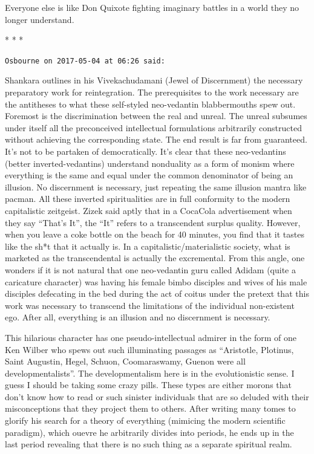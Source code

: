 Everyone else is like Don Quixote fighting imaginary battles in a world they no longer understand.



\begin{center}* * *\end{center}

\begin{footnotesize}
\begin{sffamily}
\texttt{Osbourne on 2017-05-04 at 06:26 said:}

Shankara outlines in his Vivekachudamani (Jewel of Discernment) the necessary preparatory work for reintegration. The prerequisites to the work necessary are the antitheses to what these self-styled neo-vedantin blabbermouths spew out. Foremost is the discrimination between the real and unreal. The unreal subsumes under itself all the preconceived intellectual formulations arbitrarily constructed without achieving the corresponding state. The end result is far from guaranteed. It's not to be partaken of democratically. It's clear that these neo-vedantins (better inverted-vedantins) understand nonduality as a form of monism where everything is the same and equal under the common denominator of being an illusion. No discernment is necessary, just repeating the same illusion mantra like pacman. All these inverted spiritualities are in full conformity to the modern capitalistic zeitgeist. Zizek said aptly that in a CocaCola advertisement when they say ``That's It'', the ``It'' refers to a transcendent surplus quality. However, when you leave a coke bottle on the beach for 40 minutes, you find that it tastes like the sh*t that it actually is. In a capitalistic/materialistic society, what is marketed as the transcendental is actually the excremental. From this angle, one wonders if it is not natural that one neo-vedantin guru called Adidam (quite a caricature character) was having his female bimbo disciples and wives of his male disciples defecating in the bed during the act of coitus under the pretext that this work was necessary to transcend the limitations of the individual non-existent ego. After all, everything is an illusion and no discernment is necessary.

This hilarious character has one pseudo-intellectual admirer in the form of one Ken Wilber who spews out such illuminating passages as ``Aristotle, Plotinus, Saint Augustin, Hegel, Schuon, Coomaraswamy, Guenon were all developmentalists''. The developmentalism here is in the evolutionistic sense. I guess I should be taking some crazy pills. These types are either morons that don't know how to read or such sinister individuals that are so deluded with their misconceptions that they project them to others. After writing many tomes to glorify his search for a theory of everything (mimicing the modern scientific paradigm), which ouevre he arbitrarily divides into periods, he ends up in the last period revealing that there is no such thing as a separate spiritual realm.


\end{sffamily}
\end{footnotesize}
